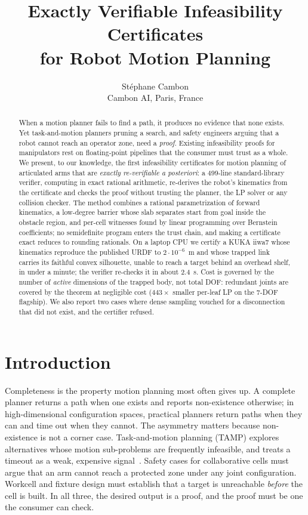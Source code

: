 \documentclass[10pt,twocolumn,letterpaper]{article}
\title{\LARGE Exactly Verifiable Infeasibility Certificates\\for Robot Motion Planning}
\author{St\'ephane Cambon\\
\small Cambon AI, Paris, France}
\date{}
\begin{document}
\maketitle

\begin{abstract}
When a motion planner fails to find a path, it produces no evidence that none exists. Yet task-and-motion planners pruning a search, and safety engineers arguing that a robot cannot reach an operator zone, need a \emph{proof}. Existing infeasibility proofs for manipulators rest on floating-point pipelines that the consumer must trust as a whole. We present, to our knowledge, the first infeasibility certificates for motion planning of articulated arms that are \emph{exactly re-verifiable a posteriori}: a 499-line standard-library verifier, computing in exact rational arithmetic, re-derives the robot's kinematics from the certificate and checks the proof without trusting the planner, the LP solver or any collision checker. The method combines a rational parametrization of forward kinematics, a low-degree barrier whose slab separates start from goal inside the obstacle region, and per-cell witnesses found by linear programming over Bernstein coefficients; no semidefinite program enters the trust chain, and making a certificate exact reduces to rounding rationals. On a laptop CPU we certify a KUKA iiwa7 whose kinematics reproduce the published URDF to $2\cdot10^{-6}$~m and whose trapped link carries its faithful convex silhouette, unable to reach a target behind an overhead shelf, in under a minute; the verifier re-checks it in about 2.4~s. Cost is governed by the number of \emph{active} dimensions of the trapped body, not total DOF: redundant joints are covered by the theorem at negligible cost ($443\times$ smaller per-leaf LP on the 7-DOF flagship). We also report two cases where dense sampling vouched for a disconnection that did not exist, and the certifier refused.
\end{abstract}

\section{Introduction}

Completeness is the property motion planning most often gives up. A complete planner returns a path when one exists and reports non-existence otherwise; in high-dimensional configuration spaces, practical planners return paths when they can and time out when they cannot. The asymmetry matters because non-existence is not a corner case. Task-and-motion planning (TAMP) explores alternatives whose motion sub-problems are frequently infeasible, and treats a timeout as a weak, expensive signal~\cite{cambon2009,dantam2018,garrett2018}. Safety cases for collaborative cells must argue that an arm cannot reach a protected zone under any joint configuration. Workcell and fixture design must establish that a target is unreachable \emph{before} the cell is built. In all three, the desired output is a proof, and the proof must be one the consumer can check.
\end{document}
